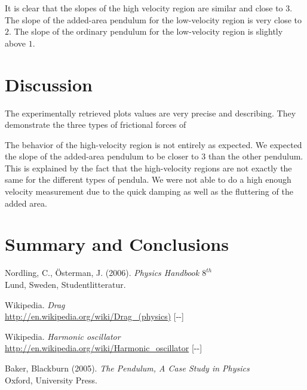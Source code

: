 \documentclass[11pt, a4paper]{article}
\newcommand{\todayswe}{\the\year-\twodigit\month-\twodigit\day}
\begin{document}
It is clear that the slopes of the high velocity region are similar and close to $3$. 
The slope of the added-area pendulum for the low-velocity region is very close to $2$.
The slope of the ordinary pendulum for the low-velocity region is slightly above $1$.



\section{Discussion}
The experimentally retrieved plots values are very precise and describing. They demonstrate the three types of frictional forces of 

The behavior of the high-velocity region is not entirely as expected. We expected the slope of the added-area pendulum 
to be closer to $3$ than the other pendulum.
This is explained by the fact that the high-velocity regions are not exactly the same for the different types of pendula. We were not 
able to do a high enough velocity measurement due to the quick damping as well as the fluttering of the added area.
\section{Summary and Conclusions}
\vfill

\begin{thebibliography}{99}
	 Nordling, C., Österman, J. (2006). 
  \textit{Physics Handbook  $8^{th}$}\\
  Lund, Sweden, Studentlitteratur.

   Wikipedia. \textit{Drag}\\ 
  \url{http://en.wikipedia.org/wiki/Drag_(physics)} [\todayswe]

   Wikipedia. \textit{Harmonic oscillator}\\ 
  \url{http://en.wikipedia.org/wiki/Harmonic_oscillator} [\todayswe]

	 Baker, Blackburn (2005). 
  \textit{The Pendulum, A Case Study in Physics}\\
  Oxford, University Press.

\end{thebibliography}

\begin{appendix}
\end{appendix}

\end{document}
